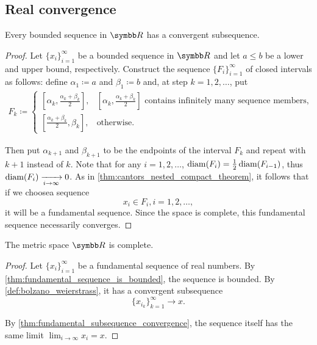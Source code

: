 \subsection{Real convergence}\label{subsec:real_vector_space_convergence}

\begin{theorem}\label{def:bolzano_weierstrass}
  Every bounded sequence in \( \R \) has a convergent subsequence.
\end{theorem}
\begin{proof}
  Let \( \{ x_i \}_{i=1}^\infty \) be a bounded sequence in \( \R \) and let \( a \leq b \) be a lower and upper bound, respectively. Construct the sequence \( \{ F_i \}_{i=1}^\infty \) of closed intervals as follows: define \( \alpha_1 \coloneqq a \) and \( \beta_1 \coloneqq b \) and, at step \( k = 1, 2, \ldots \), put
  \begin{align*}
    F_k \coloneqq \begin{cases}
      [\alpha_k, \tfrac{\alpha_k+\beta_k} 2], &[\alpha_k, \tfrac{\alpha_k+\beta_k} 2]\text{ contains infinitely many sequence members}, \\
      [\tfrac{\alpha_k+\beta_k} 2, \beta_k], &\text{otherwise}.
    \end{cases}
  \end{align*}

  Then put \( \alpha_{k+1} \) and \( \beta_{k+1} \) to be the endpoints of the interval \( F_k \) and repeat with \( k+1 \) instead of \( k \). Note that for any \( i = 1, 2, \ldots \), \( \operatorname{diam}(F_i) = \tfrac 1 2 \operatorname{diam}(F_{i-1}) \), thus \( \operatorname{diam}(F_i) \xrightarrow[i \to \infty]{} 0 \). As in \cref{thm:cantors_nested_compact_theorem}, it follows that if we choose\AOC a sequence
  \begin{equation*}
    x_i \in F_i, i = 1, 2, \ldots,
  \end{equation*}
  it will be a fundamental sequence. Since the space is complete, this fundamental sequence necessarily converges.
\end{proof}

\begin{theorem}\label{def:real_numbers_complete_metric_space}
  The metric space \( \R \) is complete.
\end{theorem}
\begin{proof}
  Let \( \{ x_i \}_{i=1}^\infty \) be a fundamental sequence of real numbers. By \cref{thm:fundamental_sequence_is_bounded}, the sequence is bounded. By \cref{def:bolzano_weierstrass}, it has a convergent subsequence
  \begin{equation*}
    \{ x_{i_k} \}_{k=1}^\infty \to x.
  \end{equation*}

  By \cref{thm:fundamental_subsequence_convergence}, the sequence itself has the same limit \( \lim_{i \to \infty} x_i = x \).
\end{proof}

